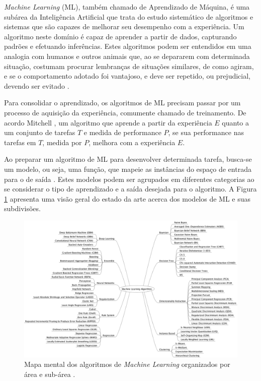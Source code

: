 
\emph{Machine Learning} (ML), também chamado de Aprendizado de Máquina, é uma subárea da Inteligência Artificial que trata do estudo sistemático de algoritmos e sistemas que são capazes de melhorar seu desempenho com a experiência. Um algoritmo neste domínio é capaz de aprender a partir de dados, capturando padrões e efetuando inferências. Estes algoritmos podem ser entendidos em uma analogia com  humanos e outros animais que, ao se depararem com determinada situação, costumam procurar lembranças de situações similares, de como agiram, e se o comportamento adotado foi vantajoso, e deve ser repetido, ou prejudicial, devendo ser evitado \cite{marsland2015machine,goodfellow2016deep,flach2012machine}.

Para consolidar o aprendizado, os algoritmos de ML precisam passar por um processo de aquisição da experiência, comumente chamado de treinamento. De acordo Mitchell \cite{mitchell1997machine}, um algoritmo que aprende a partir da experiência $E$ quanto a um conjunto de tarefas $T$ e medida de performance $P$, se sua performance nas tarefas em $T$, medida por $P$, melhora com a experiência $E$.

Ao preparar um algoritmo de ML para desenvolver determinada tarefa, busca-se um modelo, ou seja, uma função, que mapeie as instâncias do espaço de entrada para o de saída \cite{flach2012machine}. Estes modelos podem ser agrupados em diferentes categorias ao se considerar o tipo de aprendizado e a saída desejada para o algoritmo. A Figura \ref{fig:ml_algorithms} apresenta uma visão geral do estado da arte acerca dos modelos de ML e suas subdivisões.

\begin{figure}
	\includegraphics[width=\linewidth]{img/machinelearningalgorithms.png}
	\caption{Mapa mental dos algoritmos de \emph{Machine Learning} organizados por área e sub-área \cite{ml:algos}.}
	\label{fig:ml_algorithms}
\end{figure}

